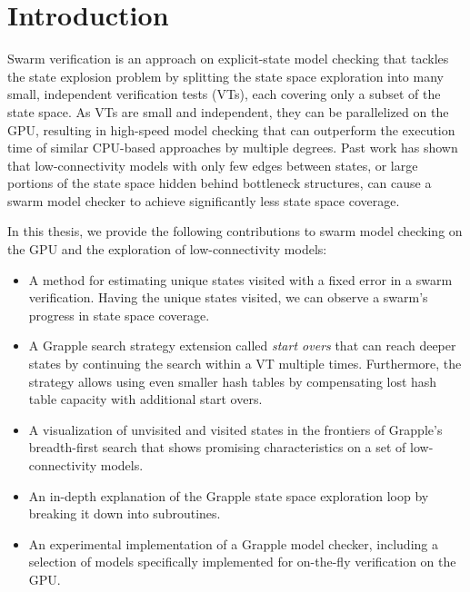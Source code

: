 \documentclass[
fancyheadings, %
%
%
]{stsreprt}
\begin{document}
\tableofcontents
\listofalgorithms
\listoffigures
\listoftables

\mainmatter

\chapter{Introduction}

Swarm verification is an approach on explicit-state model checking that tackles the state explosion problem by splitting the state space exploration into many small, independent verification tests (VTs), each covering only a subset of the state space.
As VTs are small and independent, they can be parallelized on the GPU, resulting in high-speed model checking that can outperform the execution time of similar CPU-based approaches by multiple degrees.
Past work has shown that low-connectivity models with only few edges between states, or large portions of the state space hidden behind bottleneck structures, can cause a swarm model checker to achieve significantly less state space coverage.


In this thesis, we provide the following contributions to swarm model checking on the GPU and the exploration of low-connectivity models:

\begin{itemize}
    \item A method for estimating unique states visited with a fixed error in a swarm verification.
          Having the unique states visited, we can observe a swarm's progress in state space coverage.
    \item A Grapple search strategy extension called \emph{start overs} that can reach deeper states by continuing the search within a VT multiple times.
          Furthermore, the strategy allows using even smaller hash tables by compensating lost hash table capacity with additional start overs.
    \item A visualization of unvisited and visited states in the frontiers of Grapple's breadth-first search that shows promising characteristics on a set of low-connectivity models.
    \item An in-depth explanation of the Grapple state space exploration loop by breaking it down into subroutines.
    \item An experimental implementation of a Grapple model checker, including a selection of models specifically implemented for on-the-fly verification on the GPU.
\end{itemize}
\end{document}
